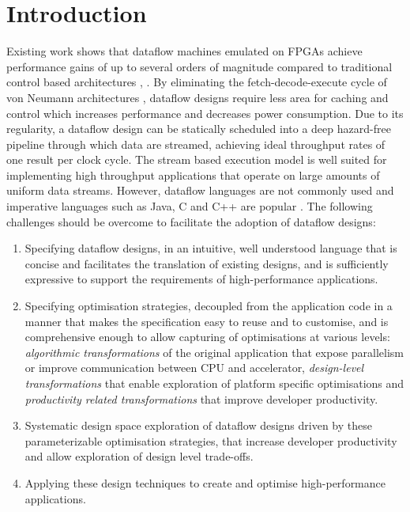 \section{Introduction}

Existing work shows that dataflow machines emulated on FPGAs achieve
performance gains of up to several orders of magnitude compared to
traditional control based architectures \cite{Flynn:Pell:Mencer:2012},
\cite{Mencer:2012}. By eliminating the fetch-decode-execute cycle of
von Neumann architectures \cite{Neumann:1993}, dataflow designs
require less area for caching and control which increases performance
and decreases power consumption. Due to its regularity, a dataflow
design can be statically scheduled into a deep hazard-free pipeline
through which data are streamed, achieving ideal throughput rates of
one result per clock cycle. The stream based execution model is well
suited for implementing high throughput applications that operate on
large amounts of uniform data streams. However, dataflow languages are
not commonly used and imperative languages such as Java, C and C++ are
popular \cite{Tiobe:2012}. The following challenges should be overcome
to facilitate the adoption of dataflow designs:
\begin{enumerate}
\item Specifying dataflow designs, in an intuitive, well understood
  language that is concise and facilitates the translation of existing
  designs, and is sufficiently expressive to support the requirements
  of high-performance applications.
\item Specifying optimisation strategies, decoupled from the
  application code in a manner that makes the specification easy to
  reuse and to customise, and is comprehensive enough to allow
  capturing of optimisations at various levels: \emph{algorithmic
    transformations} of the original application that expose
  parallelism or improve communication between CPU and accelerator,
  \emph{design-level transformations} that enable exploration of
  platform specific optimisations and \emph{productivity related
    transformations} that improve developer productivity.
\item Systematic design space exploration of dataflow designs driven
  by these parameterizable optimisation strategies, that increase
  developer productivity and allow exploration of design level
  trade-offs.
\item Applying these design techniques to create and optimise
  high-performance applications.
\end{enumerate}

